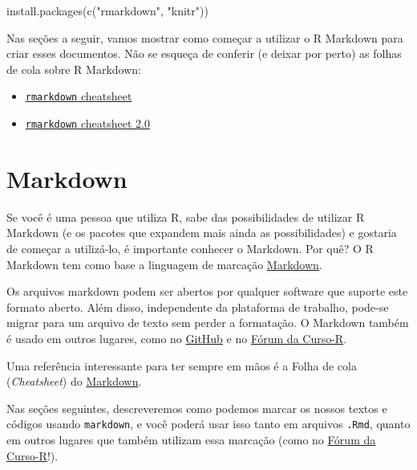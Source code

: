 \documentclass[
]{book}
\newenvironment{Shaded}{\begin{snugshade}}{\end{snugshade}}
\newcommand{\FunctionTok}[1]{\textcolor[rgb]{0.00,0.00,0.00}{#1}}
\newcommand{\NormalTok}[1]{#1}
\newcommand{\StringTok}[1]{\textcolor[rgb]{0.31,0.60,0.02}{#1}}
\begin{document}
\begin{Shaded}
\begin{Highlighting}[]
\FunctionTok{install.packages}\NormalTok{(}\FunctionTok{c}\NormalTok{(}\StringTok{"rmarkdown"}\NormalTok{, }\StringTok{"knitr"}\NormalTok{))}
\end{Highlighting}
\end{Shaded}

Nas seções a seguir, vamos mostrar como começar a utilizar o R Markdown para criar esses documentos. Não se esqueça de conferir (e deixar por perto) as folhas de cola sobre R Markdown:

\begin{itemize}
\item
  \href{https://www.rstudio.com/wp-content/uploads/2015/02/rmarkdown-cheatsheet.pdf}{\texttt{rmarkdown} cheatsheet}
\item
  \href{http://www.rstudio.com/wp-content/uploads/2016/03/rmarkdown-cheatsheet-2.0.pdf}{\texttt{rmarkdown} cheatsheet 2.0}
\end{itemize}

\hypertarget{markdown}{%
\section{Markdown}\label{markdown}}

Se você é uma pessoa que utiliza R, sabe das possibilidades de utilizar R Markdown (e os pacotes que expandem mais ainda as possibilidades) e gostaria de começar a utilizá-lo, é importante conhecer o Markdown. Por quê? O R Markdown tem como base a linguagem de marcação \href{https://www.markdownguide.org/}{Markdown}.

Os arquivos markdown podem ser abertos por qualquer software que suporte este formato aberto. Além disso, independente da plataforma de trabalho, pode-se migrar para um arquivo de texto sem perder a formatação. O Markdown também é usado em outros lugares, como no \href{https://github.com/}{GitHub} e no \href{https://discourse.curso-r.com}{Fórum da Curso-R}.

Uma referência interessante para ter sempre em mãos é a Folha de cola (\emph{Cheatsheet}) do \href{https://github.com/adam-p/markdown-here/wiki/Markdown-Cheatsheet}{Markdown}.

Nas seções seguintes, descreveremos como podemos marcar os nossos textos e códigos usando \texttt{markdown}, e você poderá usar isso tanto em arquivos \texttt{.Rmd}, quanto em outros lugares que também utilizam essa marcação (como no \href{https://discourse.curso-r.com}{Fórum da Curso-R}!).
\end{document}
